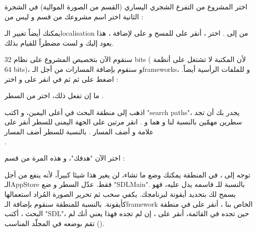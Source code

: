 
اختر المشروع من التفرع الشجري اليساري (القسم
من الصورة الموالية) في الشجرة الثانية اختر اسم مشروعك من قسم 
و ليس من
 :


يمكنك أيضاً تغيير الـ\textenglish{localisation}
من 
إلى 
.
اختر 
،
أنقر على
\InlineCode{-}
للمسح و على 
\InlineCode{+}
لإضافة 
،
هذا يعود إليك و لست مضطراً للقيام بذلك.

سنقوم الآن بتخصيص المشروع على نظام
\textenglish{32 bits}
( لأن المكتبة لا تشتغل على أنظمة
\textenglish{64 bits})،
و سنقوم بإضافة المسارات من أجل الـ\textenglish{frameworks}،
و للملفات الرأسية أيضاً. اضغط على
ثم 
ثم في 
انقر على
 و اختر
 :


ما إن تفعل ذلك، اختر
من السطر
.


اذهب إلى منطقة البحث في أعلى اليمين، و اكتب
"\textenglish{search paths}"،
يجدر بك أن تجد سطرين مهمّين بالنسبة لنا و هما
و 
.
انقر مرتين على الجهة اليمنى للسطر 
أنقر على علامة
\InlineCode{+}
 و أضف المسار
.
بالنسبة للسطر 
أضف المسار\\
.


اختر الآن "هدفك"، و هذه المرة من قسم 
 :


توجه إلى 
،
في المنطقة
يمكنك وضع ما تشاء، لن يغير هذا شيئا كبيراً، لأنه ينفع من أجل الـ\textenglish{AppStore}
فقط. عدّل السطر 
و ضع 
"\textenglish{SDLMain}".
بالنسبة للـ
فاسمه يدل عليه، فهو يسمح لك بتحديد أيقونة لبرنامجك. يكفي سحب ثم تحرير الصورة المُراد استعمالها كأيقونة. بالنسبة للمنطقة 
سنقوم بإضافة الـ\textenglish{framework}
الخاص بنا
،
أنقر على
\InlineCode{+}
في منطقة البحث ، أكتب 
"\textenglish{SDL}"،
حين تجده في القائمة، أنقر على 
،
إن لم تجده فهذا يعني أنك لم تقم بوضعه في المجلّد المناسب 
().

